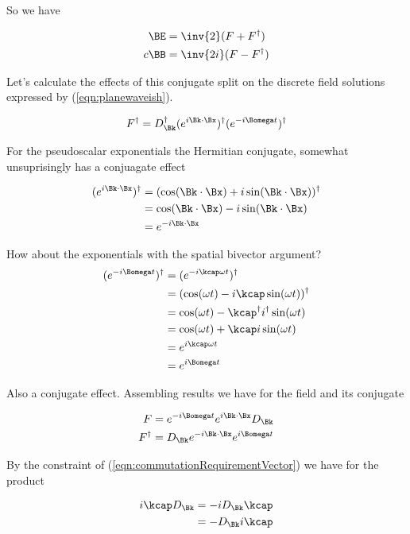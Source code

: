 \documentclass[]{eliblog}
\begin{document}
So we have 

\begin{align}
\BE &= \inv{2}(F + F^\dagger) \\
c \BB &= \inv{2i}(F - F^\dagger)
\end{align}

Let's calculate the effects of this conjugate split on the discrete field solutions expressed by 
(\ref{eqn:planewaveish}).

\begin{align*}
F^\dagger &= D_\Bk^\dagger (e^{i \Bk \cdot \Bx})^\dagger (e^{-i\Bomega t})^\dagger \\
\end{align*}

For the pseudoscalar exponentials the Hermitian conjugate, somewhat unsuprisingly has a conjuagate effect

\begin{align*}
(e^{i \Bk \cdot \Bx})^\dagger
&= 
(\cos(\Bk \cdot \Bx) +i\sin(\Bk \cdot \Bx))^\dagger \\
&= 
\cos(\Bk \cdot \Bx) -i\sin(\Bk \cdot \Bx) \\
&= 
e^{-i\Bk \cdot \Bx}
\end{align*}

How about the exponentials with the spatial bivector argument?
\begin{align*}
(e^{-i\Bomega t})^\dagger 
&=
(e^{-i \kcap \omega t})^\dagger  \\
&=
(\cos(\omega t) - i \kcap \sin(\omega t))^\dagger \\
&=
\cos(\omega t) - \kcap^\dagger i^\dagger \sin(\omega t) \\
&=
\cos(\omega t) + \kcap i \sin(\omega t) \\
&= 
e^{i \kcap \omega t} \\
&= 
e^{i \Bomega t} 
\end{align*}

Also a conjugate effect.  Assembling results we have for the field and its conjugate

\begin{align*}
F &= e^{-i\Bomega t} e^{i \Bk \cdot \Bx} D_\Bk  \\
F^\dagger &= D_\Bk e^{-i \Bk \cdot \Bx} e^{i\Bomega t}
\end{align*}

By the constraint of (\ref{eqn:commutationRequirementVector}) we have for the product

\begin{align*}
i \kcap D_\Bk 
&= 
-i D_\Bk \kcap \\
&= 
- D_\Bk i \kcap \\
\end{align*}
\end{document}
